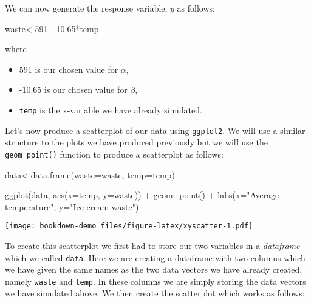 \documentclass[
]{book}
\newenvironment{Shaded}{\begin{snugshade}}{\end{snugshade}}
\newcommand{\AttributeTok}[1]{\textcolor[rgb]{0.77,0.63,0.00}{#1}}
\newcommand{\DecValTok}[1]{\textcolor[rgb]{0.00,0.00,0.81}{#1}}
\newcommand{\FloatTok}[1]{\textcolor[rgb]{0.00,0.00,0.81}{#1}}
\newcommand{\FunctionTok}[1]{\textcolor[rgb]{0.00,0.00,0.00}{#1}}
\newcommand{\NormalTok}[1]{#1}
\newcommand{\OtherTok}[1]{\textcolor[rgb]{0.56,0.35,0.01}{#1}}
\newcommand{\SpecialCharTok}[1]{\textcolor[rgb]{0.00,0.00,0.00}{#1}}
\newcommand{\StringTok}[1]{\textcolor[rgb]{0.31,0.60,0.02}{#1}}
\providecommand{\tightlist}{%
  \setlength{\itemsep}{0pt}\setlength{\parskip}{0pt}}
\begin{document}
We can now generate the response variable, \(y\) as follows:

\begin{Shaded}
\begin{Highlighting}[]
\NormalTok{waste}\OtherTok{\textless{}{-}}\DecValTok{591} \SpecialCharTok{{-}} \FloatTok{10.65}\SpecialCharTok{*}\NormalTok{temp}
\end{Highlighting}
\end{Shaded}

where

\begin{itemize}
\tightlist
\item
  591 is our chosen value for \(\alpha\),
\item
  -10.65 is our chosen value for \(\beta\),
\item
  \texttt{temp} is the x-variable we have already simulated.
\end{itemize}

Let's now produce a scatterplot of our data using \texttt{ggplot2}. We will use a similar structure to the plots we have produced previously but we will use the \texttt{geom\_point()} function to produce a scatterplot as follows:

\begin{Shaded}
\begin{Highlighting}[]
\NormalTok{data}\OtherTok{\textless{}{-}}\FunctionTok{data.frame}\NormalTok{(}\AttributeTok{waste=}\NormalTok{waste, }\AttributeTok{temp=}\NormalTok{temp)}

\FunctionTok{ggplot}\NormalTok{(data, }\FunctionTok{aes}\NormalTok{(}\AttributeTok{x=}\NormalTok{temp, }\AttributeTok{y=}\NormalTok{waste)) }\SpecialCharTok{+} 
  \FunctionTok{geom\_point}\NormalTok{() }\SpecialCharTok{+} 
  \FunctionTok{labs}\NormalTok{(}\AttributeTok{x=}\StringTok{"Average temperature"}\NormalTok{, }\AttributeTok{y=}\StringTok{"Ice cream waste"}\NormalTok{)}
\end{Highlighting}
\end{Shaded}

\texttt{[image: bookdown-demo\_files/figure-latex/xyscatter-1.pdf]}

To create this scatterplot we first had to store our two variables in a \emph{dataframe} which we called \texttt{data}. Here we are creating a dataframe with two columns which we have given the same names as the two data vectors we have already created, namely \texttt{waste} and \texttt{temp}. In these columns we are simply storing the data vectors we have simulated above. We then create the scatterplot which works as follows:
\end{document}
